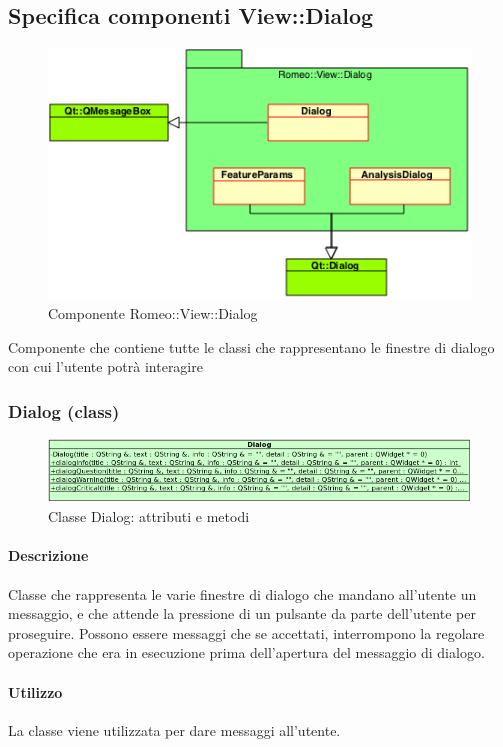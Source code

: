 \color{black}
\subsection{Specifica componenti View::Dialog}
\label{specificaDialog}
\begin{figure}[!h]

			\includegraphics[width=0.7\linewidth]{../Specifica_Tecnica/Content/Immagini/Romeo__View__Dialog.png}
			\caption{Componente Romeo::View::Dialog}
			\label{comp_romeo::view::dialog}
\end{figure}
Componente che contiene tutte le classi che rappresentano le finestre di dialogo con cui l'utente potrà interagire
\pagebreak
\subsubsection{Dialog (class)}
\label{spedialog}
\begin{figure}[!h]
\centering
			\includegraphics[width=1.1\linewidth]{./Content/Immagini/view/Dialog.png}
			\caption{Classe Dialog: attributi e metodi}
			\label{cl_dia}
\end{figure}
\paragraph{Descrizione \\}
Classe che rappresenta le varie finestre di dialogo che mandano all'utente un messaggio, e che attende la pressione di un pulsante da parte dell'utente per proseguire. Possono essere messaggi che se accettati, interrompono la regolare operazione che era in esecuzione prima dell'apertura del messaggio di dialogo.
\paragraph{Utilizzo\\}
La classe viene utilizzata per dare messaggi all'utente.
